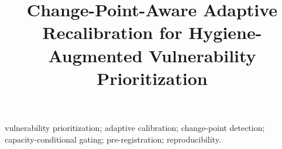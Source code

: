 \documentclass[journal]{IEEEtran}
\title{Change-Point-Aware Adaptive Recalibration for
Hygiene-Augmented Vulnerability Prioritization}
\author{%
  \IEEEauthorblockN{Harshavardhan Malla}
  \IEEEauthorblockA{Independent Researcher}%
}
\begin{document}
\maketitle

\begin{abstract}

\end{abstract}

\begin{IEEEkeywords}
vulnerability prioritization; adaptive calibration; change-point detection;
capacity-conditional gating; pre-registration; reproducibility.
\end{IEEEkeywords}















\end{document}
